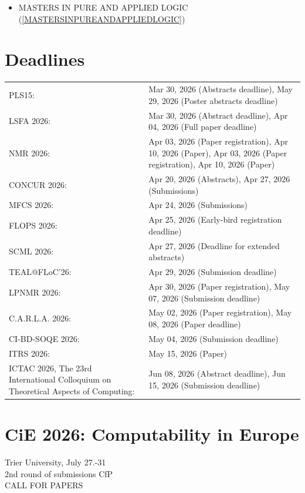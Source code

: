 \documentclass[prodmode,acmtecs]{acmsmall} %
\begin{document}
\begin{itemize}
\begin{itemize}\item MASTERS IN PURE AND APPLIED LOGIC (\cref{MASTERSINPUREANDAPPLIEDLOGIC})
\end{itemize} 
\end{itemize}\section{Deadlines}\label{deadlines}\begin{tabulary}{\linewidth}{LL}PLS15:  & Mar 30, 2026 (Abstracts deadline), May 29, 2026 (Poster abstracts deadline) \\
LSFA 2026:  & Mar 30, 2026 (Abstract deadline), Apr 04, 2026 (Full paper deadline) \\
NMR 2026:  & Apr 03, 2026 (Paper registration), Apr 10, 2026 (Paper), Apr 03, 2026 (Paper registration), Apr 10, 2026 (Paper) \\
CONCUR 2026:  & Apr 20, 2026 (Abstracts), Apr 27, 2026 (Submissions) \\
MFCS 2026:  & Apr 24, 2026 (Submissions) \\
FLOPS 2026:  & Apr 25, 2026 (Early-bird registration deadline) \\
SCML 2026:  & Apr 27, 2026 (Deadline for extended abstracts) \\
TEAL@FLoC'26:  & Apr 29, 2026 (Submission deadline) \\
LPNMR 2026:  & Apr 30, 2026 (Paper registration), May 07, 2026 (Submission deadline) \\
C.A.R.L.A. 2026:  & May 02, 2026 (Paper registration), May 08, 2026 (Paper deadline) \\
CI-BD-SOQE 2026:  & May 04, 2026 (Submission deadline) \\
ITRS 2026:  & May 15, 2026 (Paper) \\
ICTAC 2026, The 23rd International Colloquium on Theoretical Aspects of Computing:  & Jun 08, 2026 (Abstract deadline), Jun 15, 2026 (Submission deadline) \\
\end{tabulary}
\section{CiE 2026: Computability in Europe}\label{CiE2026}  Trier University, July 27.-31\\ 
  2nd round of submissions CfP\\ 
CALL FOR PAPERS 
\end{document}
